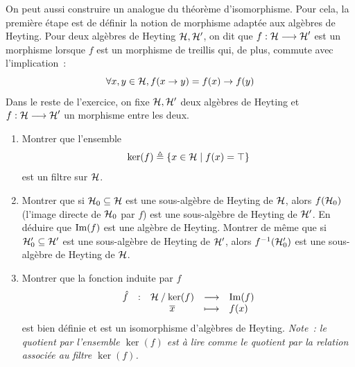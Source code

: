 \begin{exercise}
  \noindent
  On peut aussi construire un analogue du  théorème
  d'isomorphisme. Pour cela, la première étape est de définir la notion de
  morphisme adaptée aux algèbres de Heyting. Pour deux algèbres de
  Heyting $\mathcal{H},\mathcal{H}'$, on dit que $f : \displaystyle \mathcal{H} \longrightarrow \mathcal{H}'$
  est un morphisme lorsque $f$ est un morphisme de treillis qui, de plus,
  commute avec l'implication~:
  \[\forall x,y \in \mathcal{H}, f(x \to y) = f(x) \to f(y)\]
  Dans le reste de l'exercice, on fixe $\mathcal{H},\mathcal{H}'$ deux algèbres de
  Heyting et $f : \displaystyle \mathcal{H} \longrightarrow \mathcal{H}'$ un morphisme entre les
  deux.
  \begin{enumerate}[label=(\roman*),resume]
    \item Montrer que l'ensemble
    \[\ker(f) \triangleq \left\{ x \in \mathcal{H} \;\middle\vert\; f(x) = \top \right\}\]
    est un filtre sur $\mathcal{H}$.
  \item Montrer que si $\mathcal{H}_0\subseteq \mathcal{H}$ est une sous-algèbre de
    Heyting de $\mathcal{H}$, alors $f(\mathcal{H}_0)$ (l'image directe de
    $\mathcal{H}_0$ par $f$) est une sous-algèbre de Heyting de $\mathcal{H}'$. En
    déduire que $\operatorname{Im}(f)$ est une algèbre de Heyting. Montrer de même que
    si $\mathcal{H}'_0\subseteq\mathcal{H}'$ est une sous-algèbre de Heyting de
    $\mathcal{H}'$, alors $f^{-1}(\mathcal{H}'_0)$ est une sous-algèbre de Heyting
    de $\mathcal{H}$.
  \item Montrer que la fonction induite par $f$
    \[\makeFun{\relev{f}}{\quot{\varBH}{\ker(f)}}{\im(f)}{\clas{x}}{f(x)}\]
    est bien définie et est un isomorphisme d'algèbres de Heyting.
    \textit{Note~: le quotient par l'ensemble $\ker(f)$ est à lire comme
      le quotient par la relation associée au filtre $\ker(f)$.}
  \end{enumerate}
\end{exercise}

